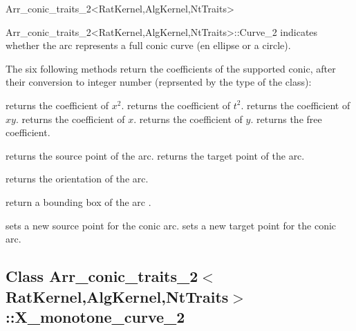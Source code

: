 \begin{ccRefClass}{Arr_conic_traits_2<RatKernel,AlgKernel,NtTraits>}
\begin{ccClass}{Arr_conic_traits_2<RatKernel,AlgKernel,NtTraits>::Curve_2}
  {indicates whether the arc represents a full conic curve (en ellipse or
   a circle).}

The six following methods return the coefficients of the supported conic,
after their conversion to integer number (reprsented by the 
type of the  class):


  {returns the coefficient of $x^2$.}
\ccGlue
{}
  {returns the coefficient of $t^2$.}
\ccGlue
{}
  {returns the coefficient of $x y$.}
\ccGlue
{}
  {returns the coefficient of $x$.}
\ccGlue
{}
  {returns the coefficient of $y$.}
\ccGlue
{}
  {returns the free coefficient.}


  {returns the source point of the arc.
   }
\ccGlue
{}
  {returns the target point of the arc.
   }

  {returns the orientation of the arc.}

  {return a bounding box of the arc \ccVar{}.}


\ccOperations

  {sets a new source point for the conic arc.
   }
\ccGlue
{}
  {sets a new target point for the conic arc.
   }

\end{ccClass}

\subsection*{Class 
Arr\_conic\_traits\_2$<$RatKernel,AlgKernel,NtTraits$>$::X\_monotone\_curve\_2}


\end{ccRefClass}
